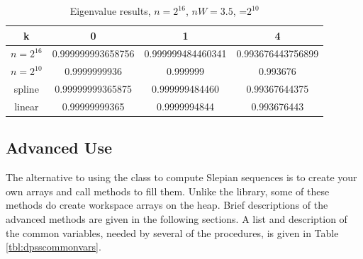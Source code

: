 \begin{table}[!htb]
    \caption[Example eigenvalue errors]{Eigenvalue results, $n=2^{16}$, $nW=3.5$, =$2^{10}$\label{tbl:interpeigen}}    
    \centering
    \renewcommand{\arraystretch}{1.3}
    \vspace*{-0.8em}
    \begin{tabular}{c|ccc}
         \hline\hline
            k &  0 & 1 & 4\\
         \hline
         $n=2^{16}$  & 0.999999993658756               & 0.999999484460341              & 0.993676443756899\\
         $n=2^{10}$  & 0.9999999936\color{red}{61152}  & 0.999999\color{red}{993661152} & 0.993676\color{red}{999048759}\\
          spline  & 0.99999999365875\color{red}{5}  & 0.999999484460\color{red}{287} & 0.99367644375\color{red}{0335}\\
          linear   & 0.99999999365\color{red}{7007}  & 0.9999994844\color{red}{51435} & 0.993676443\color{red}{651266}\\
        \hline
    \end{tabular}
\end{table}

\subsection{Advanced Use}

The alternative to using the  class to compute Slepian sequences is to create your own arrays and call methods to fill them.  Unlike the  library, some of these methods do create workspace arrays on the heap.  Brief descriptions of the advanced methods are given in the following sections.  A list and description of the common variables, needed by several of the procedures, is given in Table \ref{tbl:dpsscommonvars}.

